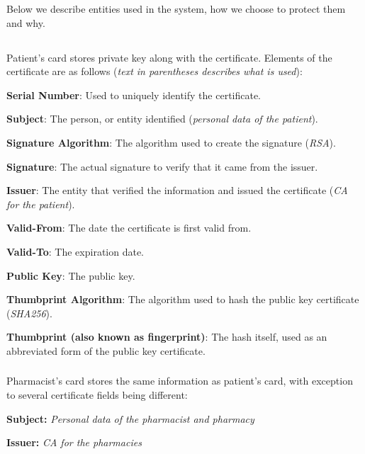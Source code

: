 Below we describe entities used in the system, how we choose to protect them and why.

\subsection{}

\subsubsection{}

Patient's card stores private key along with the certificate. Elements of the certificate are as follows ({\it text in parentheses describes what is used}):
\begin{packed_enum}
 \item {\bf Serial Number}: Used to uniquely identify the certificate.
 \item {\bf Subject}: The person, or entity identified ({\it personal data of the patient}).
 \item {\bf Signature Algorithm}: The algorithm used to create the signature ({\it RSA}).
 \item {\bf Signature}: The actual signature to verify that it came from the issuer.
 \item {\bf Issuer}: The entity that verified the information and issued the certificate ({\it CA for the patient}).
 \item {\bf Valid-From}: The date the certificate is first valid from.
 \item {\bf Valid-To}: The expiration date.
 \item {\bf Public Key}: The public key.
 \item {\bf Thumbprint Algorithm}: The algorithm used to hash the public key certificate ({\it SHA256}).
 \item {\bf Thumbprint (also known as fingerprint)}: The hash itself, used as an abbreviated form of the public key certificate.
\end{packed_enum}

\subsubsection{}

Pharmacist's card stores the same information as patient's card, with exception to several certificate fields being different:
\begin{packed_enum}
 \item {\bf Subject:} {\it Personal data of the pharmacist and pharmacy}
 \item {\bf Issuer:} {\it CA for the pharmacies}
\end{packed_enum}

